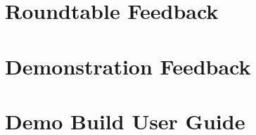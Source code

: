 \documentclass{l3proj}
\begin{document}
\chapter{Roundtable Feedback}
\label{app:roundtableFeedback}


\chapter{Demonstration Feedback}
\label{app:demonstrationFeedback}


\chapter{Demo Build User Guide}
\label{app:userGuideDemo}



\clearpage


\end{document}
